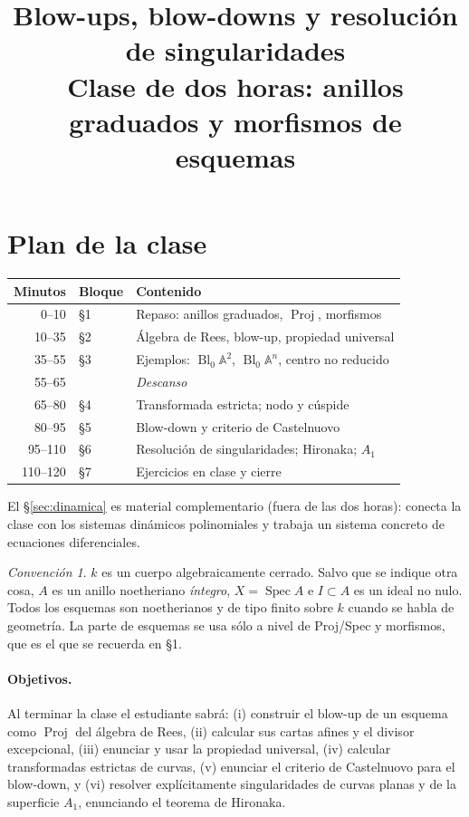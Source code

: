 \documentclass[11pt,a4paper]{article}
\title{\textbf{Blow-ups, blow-downs y resolución de singularidades}\\[2pt]
\large Clase de dos horas: anillos graduados y morfismos de esquemas}
\author{}
\date{}
\newcommand{\Spec}{\operatorname{Spec}}
\newcommand{\Proj}{\operatorname{Proj}}
\newcommand{\Bl}{\operatorname{Bl}}
\newcommand{\A}{\mathbb{A}}
\theoremstyle{plain}
\theoremstyle{definition}
\theoremstyle{remark}
\newtheorem*{convencion}{Convención}
\begin{document}
\maketitle

\section*{Plan de la clase}

\begin{center}
\begin{tabular}{@{}rll@{}}
\toprule
Minutos & Bloque & Contenido \\
\midrule
0--10 & \S1 & Repaso: anillos graduados, $\Proj$, morfismos \\
10--35 & \S2 & Álgebra de Rees, blow-up, propiedad universal \\
35--55 & \S3 & Ejemplos: $\Bl_0\A^2$, $\Bl_0\A^n$, centro no reducido \\
55--65 & & \emph{Descanso} \\
65--80 & \S4 & Transformada estricta; nodo y cúspide \\
80--95 & \S5 & Blow-down y criterio de Castelnuovo \\
95--110 & \S6 & Resolución de singularidades; Hironaka; $A_1$ \\
110--120 & \S7 & Ejercicios en clase y cierre \\
\bottomrule
\end{tabular}
\end{center}

\noindent El \S\ref{sec:dinamica} es material complementario (fuera de las dos horas): conecta la clase con los sistemas dinámicos polinomiales y trabaja un sistema concreto de ecuaciones diferenciales.

\begin{convencion}
$k$ es un cuerpo algebraicamente cerrado. Salvo que se indique otra cosa, $A$ es un anillo noetheriano \emph{íntegro}, $X=\Spec A$ e $I\subset A$ es un ideal no nulo. Todos los esquemas son noetherianos y de tipo finito sobre $k$ cuando se habla de geometría. La parte de esquemas se usa sólo a nivel de Proj/Spec y morfismos, que es el que se recuerda en \S1.
\end{convencion}

\paragraph{Objetivos.} Al terminar la clase el estudiante sabrá: (i) construir el blow-up de un esquema como $\Proj$ del álgebra de Rees, (ii) calcular sus cartas afines y el divisor excepcional, (iii) enunciar y usar la propiedad universal, (iv) calcular transformadas estrictas de curvas, (v) enunciar el criterio de Castelnuovo para el blow-down, y (vi) resolver explícitamente singularidades de curvas planas y de la superficie $A_1$, enunciando el teorema de Hironaka.
\end{document}
